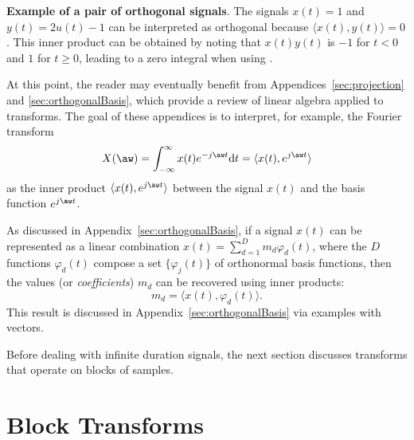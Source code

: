\bExample \textbf{Example of a pair of orthogonal signals}.
The signals $x(t)=1$ and $y(t)=2u(t)-1$ can be interpreted as orthogonal because $\langle x(t),y(t)\rangle = 0$. This inner product can be obtained by noting that $x(t)y(t)$ is $-1$ for $t<0$ and $1$ for $t\ge0$, leading to a zero integral when using .
\eExample


At this point, the reader may eventually benefit from 
Appendices~\ref{sec:projection} and \ref{sec:orthogonalBasis}, which provide a review of linear algebra applied to transforms. The goal of these appendices is to interpret, for example, the Fourier transform
\[
X(\aw) = \int_{-\infty}^\infty x(t) e^{- j \aw t} \textrm{d}t = \langle x(t),e^{j \aw t}\rangle
\]
as the inner product $\langle x(t),e^{j \aw t}\rangle$ between the signal $x(t)$ and the basis function $e^{j \aw t}$. %

As discussed in Appendix~\ref{sec:orthogonalBasis}, if a signal $x(t)$ can be represented as a linear combination $x(t)=\sum_{d=1}^D m_d \varphi_d(t)$, where the $D$ functions $\varphi_d(t)$ compose a set $\{\varphi_j(t)\}$ of orthonormal basis functions, then the values (or \emph{coefficients}) $m_d$ can be recovered using inner products:
\begin{equation}
m_d = \langle x(t),\varphi_d(t) \rangle.
\label{eq:coefficientViaInnerProduct}
\end{equation}
This result is discussed in Appendix~\ref{sec:orthogonalBasis} via examples with vectors.

Before dealing with infinite duration signals, the next section discusses transforms that operate on blocks of samples.

\section{Block Transforms}





